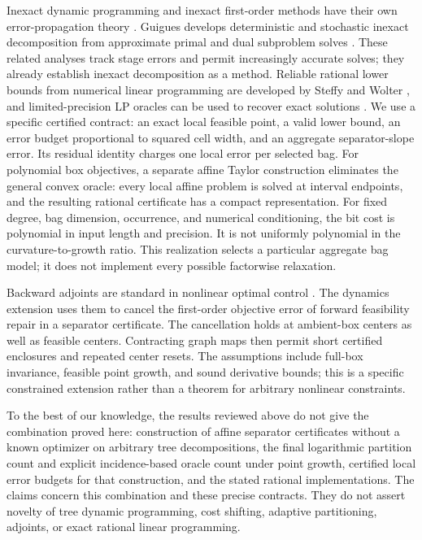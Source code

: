 Inexact dynamic programming and inexact first-order methods have their own
error-propagation theory \citep{Munos2005,DevolderGlineurNesterov2014}.
Guigues develops deterministic and stochastic inexact decomposition from
approximate primal and dual subproblem solves
\citep{Guigues2017InexactCuts,Guigues2020InexactSDDP}. These related analyses
track stage errors and permit increasingly accurate solves; they already
establish inexact decomposition as a method.
Reliable rational lower bounds from numerical linear programming are
developed by Steffy and Wolter \citep{SteffyWolter2013}, and
limited-precision LP oracles can be used to recover exact solutions
\citep{GleixnerSteffy2020}. We use a specific certified contract: an exact
local feasible point, a valid lower bound, an error budget proportional to
squared cell width, and an aggregate separator-slope error. Its residual
identity charges one local error per selected bag. For polynomial box
objectives, a separate affine Taylor construction eliminates the general
convex oracle: every local affine problem is solved at interval endpoints,
and the resulting rational certificate has a compact representation.
For fixed degree, bag dimension, occurrence, and numerical conditioning,
the bit cost is polynomial in input length and precision. It is not
uniformly polynomial in the curvature-to-growth ratio. This realization
selects a particular aggregate bag model; it does not implement every
possible factorwise relaxation.

Backward adjoints are standard in nonlinear optimal control
\citep{Hager2000}. The dynamics extension uses them to cancel the
first-order objective error of forward feasibility repair in a separator
certificate. The cancellation holds at ambient-box centers as well as
feasible centers. Contracting graph maps then permit short certified
enclosures and repeated center resets. The assumptions include full-box
invariance, feasible point growth, and sound derivative bounds; this is a
specific constrained extension rather than a theorem for arbitrary
nonlinear constraints.

To the best of our knowledge, the results reviewed above do not give the
combination proved here: construction of affine separator certificates
without a known optimizer on arbitrary tree decompositions, the final
logarithmic partition count and explicit incidence-based oracle count
under point growth, certified local error budgets for that construction,
and the stated rational implementations. The claims concern this
combination and these precise contracts. They do not assert novelty of
tree dynamic programming, cost shifting, adaptive partitioning, adjoints,
or exact rational linear programming.
